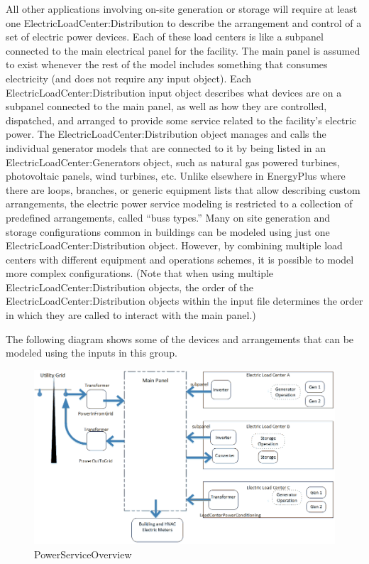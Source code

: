 All other applications involving on-site generation or storage will require at least one ElectricLoadCenter:Distribution to describe the arrangement and control of a set of electric power devices. Each of these load centers is like a subpanel connected to the main electrical panel for the facility. The main panel is assumed to exist whenever the rest of the model includes something that consumes electricity (and does not require any input object). Each ElectricLoadCenter:Distribution input object describes what devices are on a subpanel connected to the main panel, as well as how they are controlled, dispatched, and arranged to provide some service related to the facility's electric power. The ElectricLoadCenter:Distribution object manages and calls the individual generator models that are connected to it by being listed in an ElectricLoadCenter:Generators object, such as natural gas powered turbines, photovoltaic panels, wind turbines, etc. Unlike elsewhere in EnergyPlus where there are loops, branches, or generic equipment lists that allow describing custom arrangements, the electric power service modeling is restricted to a collection of predefined arrangements, called ``buss types.'' Many on site generation and storage configurations common in buildings can be modeled using just one ElectricLoadCenter:Distribution object. However, by combining multiple load centers with different equipment and operations schemes, it is possible to model more complex configurations. (Note that when using multiple ElectricLoadCenter:Distribution objects, the order of the ElectricLoadCenter:Distribution objects within the input file determines the order in which they are called to interact with the main panel.)

The following diagram shows some of the devices and arrangements that can be modeled using the inputs in this group.

\begin{figure}[htbp]
\centering
\includegraphics{media/ElectPowerServiceOverview.png}
\caption{PowerServiceOverview}
\end{figure}


